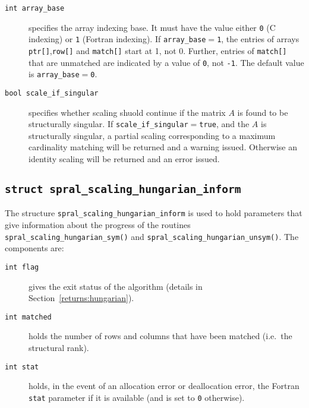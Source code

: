 \begin{description}

\item[\texttt{int array\_base}] specifies the array indexing base. It must
   have the value either \texttt{0} (C indexing) or \texttt{1} (Fortran
   indexing). If \texttt{array\_base}$=$\texttt{1}, the entries of arrays
   \texttt{ptr[]},\texttt{row[]} and \texttt{match[]} start at 1, not 0.
   Further, entries of \texttt{match[]} that are unmatched are indicated by a
   value of \texttt{0}, not \texttt{-1}.
   The default value is \texttt{array\_base}$=$\texttt{0}.

\item[\texttt{bool scale\_if\_singular}]
specifies whether scaling shuold continue if the matrix $A$ is found to be
structurally singular. If \texttt{scale\_if\_singular}$=$\texttt{true},
and the $A$ is structurally singular, a partial scaling corresponding to a
maximum cardinality matching will be returned and a warning issued. Otherwise
an identity scaling will be returned and an error issued.

\end{description}

\subsection{\texttt{struct spral\_scaling\_hungarian\_inform}} \label{type:hungarian_inform}

The structure \texttt{spral\_scaling\_hungarian\_inform} is used to hold parameters
that give information about the progress of the routines
\texttt{spral\_scaling\_hungarian\_sym()} and \texttt{spral\_scaling\_hungarian\_unsym()}. The components are:

\begin{description}

\item[\texttt{int flag}] gives the exit status of the algorithm (details in Section~\ref{returns:hungarian}).

\item[\texttt{int matched}] holds the number of rows and columns that have been matched (i.e.~the structural rank).

\item[\texttt{int stat}] holds, in the event of an allocation error or deallocation error, the Fortran \texttt{stat} parameter if it is available (and is set to \texttt{0} otherwise).
\end{description}

